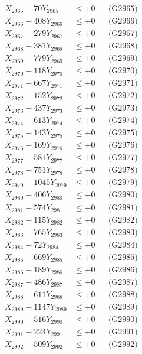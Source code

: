 \documentclass[a4paper,10pt]{article}
\begin{document}
{\begin{align}
X_{2965} - 70Y_{2965} &\leq +0 && \text{(G2965)} \\
X_{2966} - 408Y_{2966} &\leq +0 && \text{(G2966)} \\
X_{2967} - 279Y_{2967} &\leq +0 && \text{(G2967)} \\
X_{2968} - 381Y_{2968} &\leq +0 && \text{(G2968)} \\
X_{2969} - 779Y_{2969} &\leq +0 && \text{(G2969)} \\
X_{2970} - 118Y_{2970} &\leq +0 && \text{(G2970)} \\
\allowbreak
X_{2971} - 667Y_{2971} &\leq +0 && \text{(G2971)} \\
X_{2972} - 152Y_{2972} &\leq +0 && \text{(G2972)} \\
X_{2973} - 437Y_{2973} &\leq +0 && \text{(G2973)} \\
X_{2974} - 613Y_{2974} &\leq +0 && \text{(G2974)} \\
X_{2975} - 143Y_{2975} &\leq +0 && \text{(G2975)} \\
X_{2976} - 169Y_{2976} &\leq +0 && \text{(G2976)} \\
X_{2977} - 581Y_{2977} &\leq +0 && \text{(G2977)} \\
X_{2978} - 751Y_{2978} &\leq +0 && \text{(G2978)} \\
X_{2979} - 1045Y_{2979} &\leq +0 && \text{(G2979)} \\
X_{2980} - 406Y_{2980} &\leq +0 && \text{(G2980)} \\
\allowbreak
X_{2981} - 574Y_{2981} &\leq +0 && \text{(G2981)} \\
X_{2982} - 115Y_{2982} &\leq +0 && \text{(G2982)} \\
X_{2983} - 765Y_{2983} &\leq +0 && \text{(G2983)} \\
X_{2984} - 72Y_{2984} &\leq +0 && \text{(G2984)} \\
X_{2985} - 669Y_{2985} &\leq +0 && \text{(G2985)} \\
X_{2986} - 189Y_{2986} &\leq +0 && \text{(G2986)} \\
X_{2987} - 486Y_{2987} &\leq +0 && \text{(G2987)} \\
X_{2988} - 611Y_{2988} &\leq +0 && \text{(G2988)} \\
X_{2989} - 1147Y_{2989} &\leq +0 && \text{(G2989)} \\
X_{2990} - 516Y_{2990} &\leq +0 && \text{(G2990)} \\
\allowbreak
X_{2991} - 224Y_{2991} &\leq +0 && \text{(G2991)} \\
X_{2992} - 509Y_{2992} &\leq +0 && \text{(G2992)} \\

\end{align}}
\end{document}
